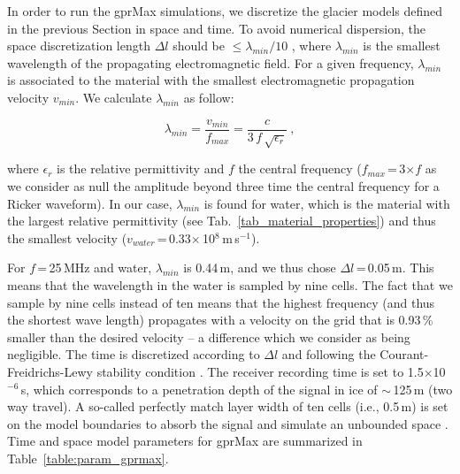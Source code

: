 In order to run the gprMax simulations, we discretize the glacier models defined in the previous Section in space and time. To avoid numerical dispersion, the space discretization length $\Delta l$ should be $\leq \lambda_{min} / 10$ \citep{Warren&al2016}, where $\lambda_{min}$ is the smallest wavelength of the propagating electromagnetic field. For a given frequency, $\lambda_{min}$ is associated to the material with the smallest electromagnetic propagation velocity $v_{min}$. We calculate $\lambda_{min}$ as follow:

\begin{equation}
   \lambda_{min} = \frac{v_{min}}{f_{max}} = \frac{c}{3\,f\,\sqrt{\epsilon_r}}~,
\end{equation}

where $\epsilon_r$ is the relative permittivity and $f$ the central frequency ($f_{max}$\,=\,3$\times f$ as we consider as null the amplitude beyond three time the central frequency for a Ricker waveform). In our case, $\lambda_{min}$ is found for water, which is the material with the largest relative permittivity (see Tab.~\ref{tab_material_properties}) and thus the smallest velocity ($v_{water}$\,=\,0.33$\times$\,10$^{8}$\,m\,s$^{-1}$). 

For $f$\,=\,25\,MHz and water, $\lambda_{min}$ is 0.44\,m, and we thus chose $\Delta l$\,=\,0.05\,m. This means that the wavelength in the water is sampled by nine cells. The fact that we sample by nine cells instead of ten means that the highest frequency (and thus the shortest wave length) propagates with a velocity on the grid that is 0.93\,\% smaller than the desired velocity \citep{Schneider2010} -- a difference which we consider as being negligible. The time is discretized according to $\Delta l$ and following the Courant-Freidrichs-Lewy stability condition \citep{Warren&al2016}. The receiver recording time is set to 1.5$\times$10$^{-6}$\,s, which corresponds to a penetration depth of the signal in ice of $\sim$\,125\,m (two way travel). A so-called perfectly match layer width of ten cells (i.e., 0.5\,m) is set on the model boundaries to absorb the signal and simulate an unbounded space \citep{Berenger1996}. Time and space model parameters for gprMax are summarized in Table~\ref{table:param_gprmax}.


